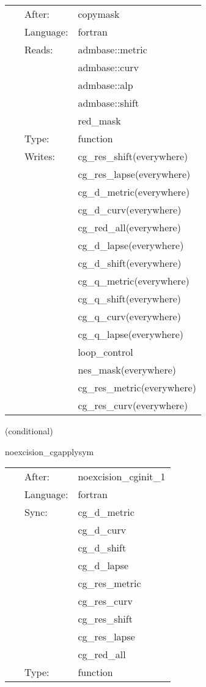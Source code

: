  \begin{tabular*}{160mm}{cll} 
~ & After:  & copymask \\ 
~ & Language:  & fortran \\ 
~ & Reads:  & admbase::metric \\ 
~& ~ &admbase::curv\\ 
~& ~ &admbase::alp\\ 
~& ~ &admbase::shift\\ 
~& ~ &red\_mask\\ 
~ & Type:  & function \\ 
~ & Writes:  & cg\_res\_shift(everywhere) \\ 
~& ~ &cg\_res\_lapse(everywhere)\\ 
~& ~ &cg\_d\_metric(everywhere)\\ 
~& ~ &cg\_d\_curv(everywhere)\\ 
~& ~ &cg\_red\_all(everywhere)\\ 
~& ~ &cg\_d\_lapse(everywhere)\\ 
~& ~ &cg\_d\_shift(everywhere)\\ 
~& ~ &cg\_q\_metric(everywhere)\\ 
~& ~ &cg\_q\_shift(everywhere)\\ 
~& ~ &cg\_q\_curv(everywhere)\\ 
~& ~ &cg\_q\_lapse(everywhere)\\ 
~& ~ &loop\_control\\ 
~& ~ &nes\_mask(everywhere)\\ 
~& ~ &cg\_res\_metric(everywhere)\\ 
~& ~ &cg\_res\_curv(everywhere)\\ 
\end{tabular*} 


\vspace{5mm}

   (conditional) 

\hspace{5mm} noexcision\_cgapplysym 

\hspace{5mm}{\it select variables for boundary conditions 1 } 


\hspace{5mm}

 \begin{tabular*}{160mm}{cll} 
~ & After:  & noexcision\_cginit\_1 \\ 
~ & Language:  & fortran \\ 
~ & Sync:  & cg\_d\_metric \\ 
~& ~ &cg\_d\_curv\\ 
~& ~ &cg\_d\_shift\\ 
~& ~ &cg\_d\_lapse\\ 
~& ~ &cg\_res\_metric\\ 
~& ~ &cg\_res\_curv\\ 
~& ~ &cg\_res\_shift\\ 
~& ~ &cg\_res\_lapse\\ 
~& ~ &cg\_red\_all\\ 
~ & Type:  & function \\ 
\end{tabular*} 


